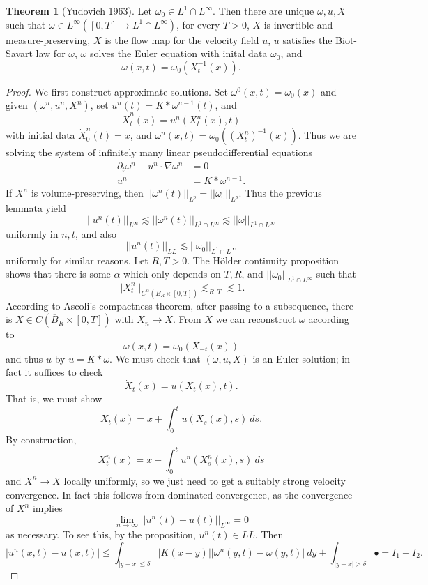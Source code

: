 \documentclass[12pt]{book}
\theoremstyle{definition}
\newtheorem{theorem}{Theorem}[chapter]
\begin{document}
\begin{theorem}[Yudovich 1963]
Let $\omega_0 \in L^1 \cap L^\infty$. Then there are unique $\omega,u,X$ such that $\omega \in L^\infty([0, T] \to L^1 \cap L^\infty)$, for every $T > 0$, $X$ is invertible and measure-preserving, $X$ is the flow map for the velocity field $u$, $u$ satisfies the Biot-Savart law for $\omega$, $\omega$ solves the Euler equation with inital data $\omega_0$, and
$$\omega(x, t) = \omega_0(X_t^{-1}(x)).$$
\end{theorem}
\begin{proof}
We first construct approximate solutions. Set $\omega^0(x, t) = \omega_0(x)$ and given $(\omega^n, u^n, X^n)$, set $u^n(t) = K * \omega^{n-1}(t)$, and
$$\dot X_t^n(x) = u^n(X_t^n(x), t)$$
with initial data $\dot X_0^n(t) = x$, and $\omega^n(x, t) = \omega_0((X_t^n)^{-1}(x))$.
Thus we are solving the system of infinitely many linear pseudodifferential equations
\begin{align*}
\partial_t \omega^n + u^n \cdot \nabla \omega^n &= 0\\
u^n &= K * \omega^{n - 1}.
\end{align*}
If $X^n$ is volume-preserving, then $||\omega^n(t)||_{L^p} = ||\omega_0||_{L^p}$.
Thus the previous lemmata yield
$$||u^n(t)||_{L^\infty} \lesssim ||\omega^n(t)||_{L^1 \cap L^\infty} \lesssim ||\omega||_{L^1 \cap L^\infty}$$
uniformly in $n,t$, and also
$$||u^n(t)||_{LL} \lesssim ||\omega_0||_{L^1 \cap L^\infty}$$
uniformly for similar reasons.
Let $R, T > 0$. The H\"older continuity proposition shows that there is some $\alpha$ which only depends on $T,R$, and $||\omega_0||_{L^1 \cap L^\infty}$ such that
$$||X^n_t||_{C^\alpha(\overline B_R \times [0, T])} \lesssim_{R, T} \lesssim 1.$$
According to Ascoli's compactness theorem, after passing to a subsequence, there is $X \in C(\overline B_R \times [0, T])$ with $X_n \to X$.
From $X$ we can reconstruct $\omega$ according to
$$\omega(x, t) = \omega_0(X_{-t}(x))$$
and thus $u$ by $u = K * \omega$.
We must check that $(\omega, u, X)$ is an Euler solution; in fact it suffices to check
$$\dot X_t(x) = u(X_t(x), t).$$
That is, we must show
$$X_t(x) = x + \int_0^t u(X_s(x), s) ~ds.$$
By construction,
$$X_t^n(x) = x + \int_0^t u^n(X_s^n(x), s) ~ds$$
and $X^n \to X$ locally uniformly, so we just need to get a suitably strong velocity convergence.
In fact this follows from dominated convergence, as the convergence of $X^n$ implies
$$\lim_{n \to \infty} ||u^n(t) - u(t)||_{L^\infty} = 0$$
as necessary.
To see this, by the proposition, $u^n(t) \in LL$. Then
$$|u^n(x, t) - u(x, t)| \leq \int_{|y - x| \leq \delta} |K(x - y)||\omega^n(y, t) - \omega(y, t)| ~dy + \int_{|y - x| > \delta} \bullet = I_1 + I_2.$$

\end{proof}
\end{document}
